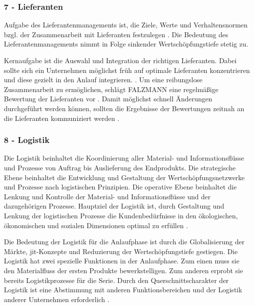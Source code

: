 \subsubsection*{7 - Lieferanten}
Aufgabe des Lieferantenmanagements ist, die Ziele, Werte und Verhaltensnormen bzgl. der Zusammenarbeit mit Lieferanten festzulegen \autocite{Schuh2008}. 
Die Bedeutung des Lieferantenmanagements nimmt in Folge sinkender Wertschöpfungstiefe stetig zu. 

Kernaufgabe ist die Auswahl und Integration der richtigen Lieferanten. Dabei sollte sich ein Unternehmen möglichst früh auf optimale Lieferanten konzentrieren und diese gezielt in den Anlauf integrieren. \autocite{Schuh2008}.  
Um eine reibungslose Zusammenarbeit zu ermöglichen, schlägt FALZMANN eine regelmäßige Bewertung der Lieferanten vor \autocite{Falzmann2007}. Damit möglichst schnell Änderungen durchgeführt werden können, sollten die Ergebnisse der Bewertungen zeitnah an die Lieferanten kommuniziert werden \autocite[70]{Hofbauer2016}. 

\subsubsection*{8 - Logistik}

Die Logistik beinhaltet die Koordinierung aller Material- und Informationsflüsse und Prozesse von Auftrag bis Auslieferung des Endprodukts. Die strategische Ebene beinhaltet die Entwicklung und Gestaltung der Wertschöpfungsnetzwerke und Prozesse nach logistischen Prinzipien. Die operative Ebene beinhaltet die Lenkung und Kontrolle der Material- und Informationsflüsse und der dazugehörigen Prozesse. 
Hauptziel der Logistik ist, durch Gestaltung und Lenkung der logistischen Prozesse die Kundenbedürfnisse in den ökologischen, ökonomischen und sozialen Dimensionen optimal zu erfüllen \autocite[28]{Schmitt2015}. 

Die Bedeutung der Logistik für die Anlaufphase ist durch die Globalisierung der Märkte, \gls{jit}-Konzepte und Reduzierung der 
Wertschöpfungstiefe gestiegen. Die Logistik hat zwei spezielle Funktionen in der Anlaufphase. Zum einen muss sie den Materialfluss der ersten Produkte bewerkstelligen. Zum anderen erprobt sie bereits Logistikprozesse für die Serie.
Durch den Querschnittscharakter der Logistik ist eine Abstimmung mit anderen Funktionsbereichen und der Logistik anderer Unternehmen erforderlich \autocite[1189]{Pfohl2000}.

